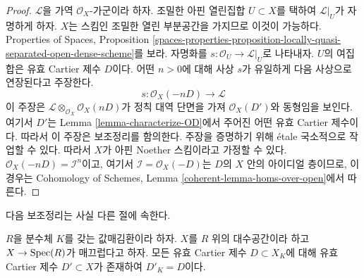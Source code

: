 \begin{proof}
$\mathcal{L}$을 가역 $\mathcal{O}_X$-가군이라 하자. 조밀한 아핀 열린집합
$U \subset X$를 택하여 $\mathcal{L}|_U$가 자명하게 하자.
$X$는 스킴인 조밀한 열린 부분공간을 가지므로 이것이 가능하다.
Properties of Spaces, Proposition
\ref{spaces-properties-proposition-locally-quasi-separated-open-dense-scheme}를
보라.
자명화를 $s : \mathcal{O}_U \to \mathcal{L}|_U$로 나타내자.
$U$의 여집합은 유효 Cartier 제수 $D$이다. 어떤 $n > 0$에 대해 사상
$s$가 유일하게 다음 사상으로 연장된다고 주장한다.
$$
s : \mathcal{O}_X(-nD) \longrightarrow \mathcal{L}
$$
이 주장은 $\mathcal{L} \otimes_{\mathcal{O}_X} \mathcal{O}_X(nD)$가 정칙
대역 단면을 가져 $\mathcal{O}_X(D')$와 동형임을 보인다. 여기서 $D'$는
Lemma \ref{lemma-characterize-OD}에서 주어진 어떤 유효 Cartier 제수이다.
따라서 이 주장은 보조정리를 함의한다. 주장을 증명하기 위해 \'etale
국소적으로 작업할 수 있다. 따라서 $X$가 아핀 Noether 스킴이라고 가정할 수
있다. $\mathcal{O}_X(-nD) = \mathcal{I}^n$이고, 여기서
$\mathcal{I} = \mathcal{O}_X(-D)$는 $D$의 $X$ 안의 아이디얼 층이므로,
이 경우는 Cohomology of Schemes, Lemma
\ref{coherent-lemma-homs-over-open}에서 따른다.
\end{proof}

\noindent
다음 보조정리는 사실 다른 절에 속한다.

\begin{lemma}
\label{lemma-smooth-over-valuation-ring-effective-Cartier}
$R$을 분수체 $K$를 갖는 값매김환이라 하자. $X$를 $R$ 위의 대수공간이라
하고 $X \to \mathop{\mathrm{Spec}}(R)$가 매끄럽다고 하자. 모든 유효 Cartier 제수
$D \subset X_K$에 대해 유효 Cartier 제수 $D' \subset X$가 존재하여
$D'_K = D$이다.
\end{lemma}


